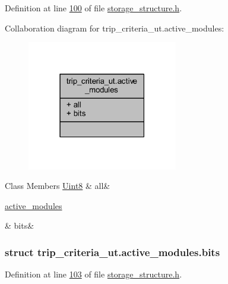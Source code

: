 Definition at line \hyperlink{a00003_source_l00100}{100} of file \hyperlink{a00003_source}{storage\+\_\+structure.\+h}.



Collaboration diagram for trip\+\_\+criteria\+\_\+ut.\+active\+\_\+modules\+:
\nopagebreak
\begin{figure}[H]
\begin{center}
\leavevmode
\includegraphics[width=186pt]{d5/ddf/a00224}
\end{center}
\end{figure}
\begin{DoxyFields}{Class Members}
\hypertarget{a00003_aa181a603769c1f98ad927e7367c7aa51}{\hyperlink{a00001_a979e3e23b9a449e69ab6a8a83b6042f8}{Uint8}}\label{a00003_aa181a603769c1f98ad927e7367c7aa51}
&
all&
\\
\hline

\hypertarget{a00003_acc411e6c13670e52124629b8ac83f7d0}{\hyperlink{a00003_d5/d4e/a00141}{active\+\_\+modules}}\label{a00003_acc411e6c13670e52124629b8ac83f7d0}
&
bits&
\\
\hline

\end{DoxyFields}
\label{d5/d4e/a00141}
\hypertarget{a00003_d5/d4e/a00141}{}
\subsubsection{struct trip\+\_\+criteria\+\_\+ut.\+active\+\_\+modules.\+bits}


Definition at line \hyperlink{a00003_source_l00103}{103} of file \hyperlink{a00003_source}{storage\+\_\+structure.\+h}.




